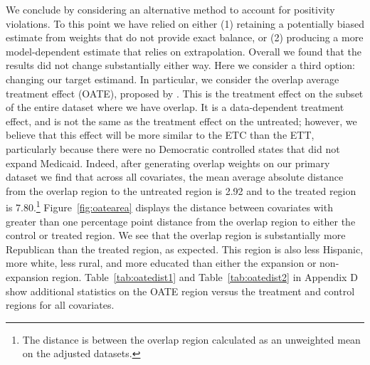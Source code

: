 \documentclass[aoas]{imsart}
\theoremstyle{plain}
\theoremstyle{remark}
\begin{document}
We conclude by considering an alternative method to account for positivity violations. To this point we have relied on either (1) retaining a potentially biased estimate from weights that do not provide exact balance, or (2) producing a more model-dependent estimate that relies on extrapolation. Overall we found that the results did not change substantially either way. Here we consider a third option: changing our target estimand. In particular, we consider the overlap average treatment effect (OATE), proposed by \cite{li2018balancing}. This is the treatment effect on the subset of the entire dataset where we have overlap. It is a data-dependent treatment effect, and is not the same as the treatment effect on the untreated; however, we believe that this effect will be more similar to the ETC than the ETT, particularly because there were no Democratic controlled states that did not expand Medicaid. Indeed, after generating overlap weights on our primary dataset we find that across all covariates, the mean average absolute distance from the overlap region to the untreated region is 2.92 and to the treated region is 7.80.\footnote{The distance is between the overlap region calculated as an unweighted mean on the adjusted datasets.} Figure~\ref{fig:oatearea} displays the distance between covariates with greater than one percentage point distance from the overlap region to either the control or treated region. We see that the overlap region is substantially more Republican than the treated region, as expected. This region is also less Hispanic, more white, less rural, and more educated than either the expansion or non-expansion region. Table~\ref{tab:oatedist1} and Table~\ref{tab:oatedist2} in Appendix D show additional statistics on the OATE region versus the treatment and control regions for all covariates.
\end{document}
